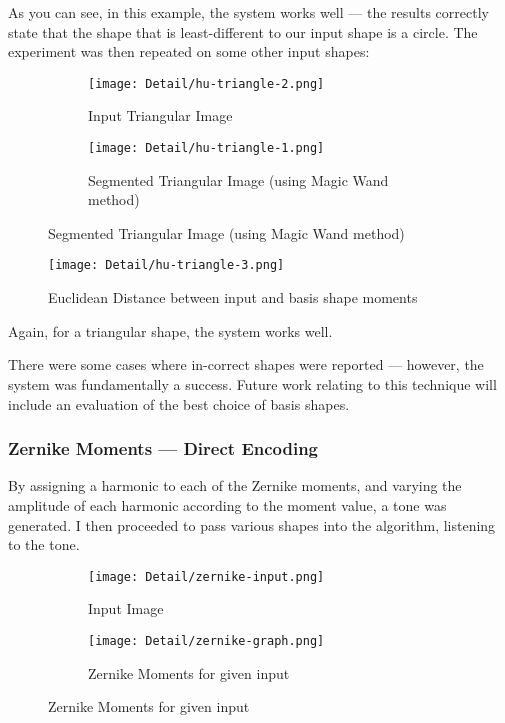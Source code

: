 As you can see, in this example, the system works well --- the results correctly state that the shape that is least-different to our input shape is a circle. The experiment was then repeated on some other input shapes:

\begin{figure}[H]
    \centering
    \begin{subfigure}[h]{0.4\textwidth}
        \centering
        \texttt{[image: Detail/hu-triangle-2.png]}
        \caption{Input Triangular Image}
    \end{subfigure}
    \begin{subfigure}[h]{0.4\textwidth}
        \centering
        \texttt{[image: Detail/hu-triangle-1.png]}
        \caption{Segmented Triangular Image (using Magic Wand method)}
    \end{subfigure}
\end{figure}

\begin{figure}[H]
    \centering
    \texttt{[image: Detail/hu-triangle-3.png]}
    \caption{Euclidean Distance between input and basis shape moments}
\end{figure}

Again, for a triangular shape, the system works well.

There were some cases where in-correct shapes were reported --- however, the system was fundamentally a success. Future work relating to this technique will include an evaluation of the best choice of basis shapes.

\subsubsection{Zernike Moments --- Direct Encoding}
By assigning a harmonic to each of the Zernike moments, and varying the amplitude of each harmonic according to the moment value, a tone was generated. I then proceeded to pass various shapes into the algorithm, listening to the tone.

\begin{figure}[H]
    \centering
    \begin{subfigure}[h]{0.2\textwidth}
        \centering
        \texttt{[image: Detail/zernike-input.png]}
        \caption{Input Image}
    \end{subfigure}
    \begin{subfigure}[h]{0.7\textwidth}
        \centering
        \texttt{[image: Detail/zernike-graph.png]}
        \caption{Zernike Moments for given input}
    \end{subfigure}
\end{figure}


